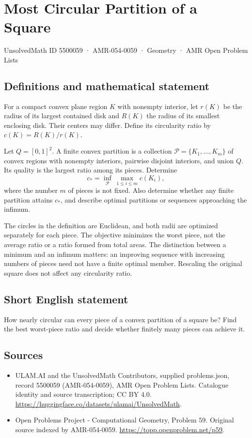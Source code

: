 \documentclass[11pt,a4paper]{article}
\begin{document}
\section*{Most Circular Partition of a Square}\label{5500059}
{\small UnsolvedMath ID 5500059 · AMR-054-0059 · Geometry · AMR Open Problem Lists}
\subsection{Definitions and mathematical statement}
For a compact convex plane region $K$ with nonempty interior, let
$r(K)$ be the radius of its largest contained disk and $R(K)$ the
radius of its smallest enclosing disk. Their centers may differ.
Define its circularity ratio by $c(K)=R(K)/r(K)$.

Let $Q=[0,1]^2$. A finite convex partition is a collection
$\mathcal P=\{K_1,\ldots,K_m\}$ of convex regions with nonempty
interiors, pairwise disjoint interiors, and union $Q$. Its quality
is the largest ratio among its pieces. Determine
\[
 c_* = \inf_{\mathcal P}\ \max_{1\le i\le m}c(K_i),
\]
where the number $m$ of pieces is not fixed. Also determine whether
any finite partition attains $c_*$, and describe optimal partitions
or sequences approaching the infimum.

The circles in the definition are Euclidean, and both radii are
optimized separately for each piece. The objective minimizes the
worst piece, not the average ratio or a ratio formed from total
areas. The distinction between a minimum and an infimum matters:
an improving sequence with increasing numbers of pieces need not
have a finite optimal member. Rescaling the original square does
not affect any circularity ratio.
\subsection{Short English statement}
How nearly circular can every piece of a convex partition of a
square be? Find the best worst-piece ratio and decide whether
finitely many pieces can achieve it.
\subsection{Sources}
\begin{itemize}
\item[S1] ULAM.AI and the UnsolvedMath Contributors, supplied problems.json, record 5500059 (AMR-054-0059), AMR Open Problem Lists. Catalogue identity and source transcription; CC BY 4.0.
\url{https://huggingface.co/datasets/ulamai/UnsolvedMath}.
\item[S2] Open Problems Project - Computational Geometry, Problem 59. Original source indexed by AMR-054-0059.
\url{https://topp.openproblem.net/p59}.
\end{itemize}
\end{document}
